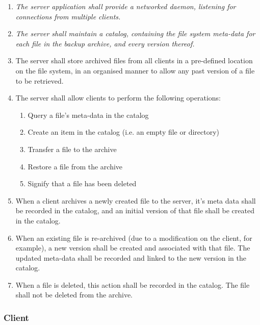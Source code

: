 \begin{enumerate}
    \item \emph{The server application shall provide a networked
        daemon, listening for connections from multiple clients.}
    \item \emph{The server shall maintain a catalog, containing the
        file system meta-data for each file in the backup archive, and
        every version thereof.}
    \item The server shall store archived files from all clients in
        a pre-defined location on the file system, in an organised
        manner to allow any past version of a file to be retrieved.
    \item The server shall allow clients to perform the following
        operations:
        \begin{enumerate}
            \item Query a file's meta-data in the catalog
            \item Create an item in the catalog (i.e. an empty file or
                directory)
            \item Transfer a file to the archive
            \item Restore a file from the archive
            \item Signify that a file has been deleted
        \end{enumerate}
    \item When a client archives a newly created file to the server,
        it's meta data shall be recorded in the catalog, and an initial
        version of that file shall be created in the catalog.
    \item When an existing file is re-archived (due to a modification
        on the client, for example), a new version shall be created and
        associated with that file. The updated meta-data shall be
        recorded and linked to the new version in the catalog.
    \item When a file is deleted, this action shall be recorded in the
        catalog. The file shall not be deleted from the archive.
\end{enumerate}

\subsubsection{Client}

